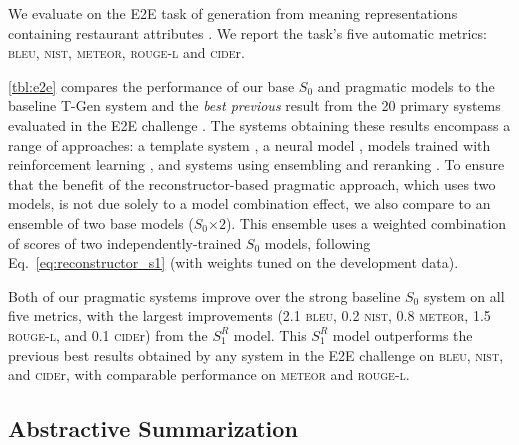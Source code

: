 \documentclass[11pt,a4paper]{article}
\newcommand{\basespk}[0]{$S_0$\xspace}
\newcommand{\pragr}[0]{$S_1^R$\xspace}
\newcommand{\bleu}{\textsc{bleu}\xspace}
\newcommand{\nist}{\textsc{nist}\xspace}
\newcommand{\meteor}{\textsc{meteor}\xspace}
\newcommand{\cider}{\textsc{cide}r\xspace}
\newcommand{\rougel}{\textsc{rouge-l}\xspace}
\begin{document}
We evaluate on the E2E task of generation from meaning representations containing restaurant attributes \cite{novikova2017e2e}.
We report the task's five automatic metrics:  \bleu \cite{papineni2002bleu}, \nist \cite{doddington2002automatic}, \meteor \cite{lavie2007meteor}, \rougel \cite{lin2004rouge} and \cider \cite{vedantam2015cider}. 

\autoref{tbl:e2e} compares the performance of our base \basespk and pragmatic models to the baseline T-Gen system \cite{duvsek2016sequence} and the \emph{best previous} result from the 20 primary systems evaluated in the E2E challenge \cite{duvsek2018findings}. The systems obtaining these results encompass a range of approaches: a template system \cite{puzikov2018e2e}, a neural model \cite{zhang2018e2e}, models trained with reinforcement learning \cite{gong2018e2e}, and systems using ensembling and reranking \cite{juraska2018ensemble}.
To ensure that the benefit of the reconstructor-based pragmatic approach, which uses two models, is not due solely to a model combination effect, we also compare to an ensemble of two base models (\basespk $\times 2$). This ensemble uses a weighted combination of scores of two independently-trained \basespk models, following Eq.\ \ref{eq:reconstructor_s1} (with weights tuned on the development data).


Both of our pragmatic systems improve over the strong baseline \basespk system 
on all five metrics, with the largest improvements (2.1 \bleu, 
0.2 \nist,
0.8 \meteor, 1.5 \rougel, and 
0.1 \cider)
from the \pragr model. This \pragr model outperforms the previous best results obtained by any system in the E2E challenge on \bleu, \nist, and \cider, with comparable performance on \meteor and \rougel.

\subsection{Abstractive Summarization}
\end{document}
